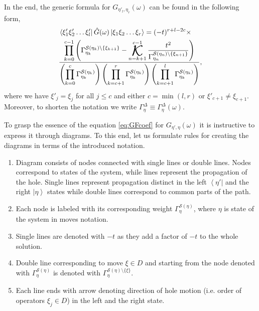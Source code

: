 \documentclass[11pt, a4paper, twocolumn]{article}
\newcommand{\ket}[1]{\left\vert #1 \right\rangle}
\newcommand{\bra}[1]{\left\langle #1 \right\vert}
\def\K{%
    \operatornamewithlimits{%
        \mathchoice{%
            \vcenter{\hbox{\huge $\mathcal{K}$}}%
        }{%
            \vcenter{\hbox{\Large $\mathcal{K}$}}%
        }{%
            \mathrm{\mathcal{K}}%
        }{%
            \mathrm{\mathcal{K}}%
        }
    }
}
\begin{document}
In the end, the generic formula for $G_{\eta'_l, \eta_r}(\omega)$ can be found in the following form, 
\begin{equation}\label{eq:GFcoef}
	\begin{split}
		&\bra{\xi'_1 \xi'_2 \hdots \xi'_l}
		\hat{G}(\omega)
		\ket{\xi_1 \xi_2 \hdots \xi_r} = (-t)^{r + l - 2c} \times \\
		&\frac{\displaystyle
		\prod_{k=0}^{c-1} \left(
			\Gamma_{\eta_k}^{\mathcal{S}(\eta_k)\setminus\{\xi_{k+1}\}} - \K_{n=k+1}^{c-1} \frac{t^2}{\Gamma_{\eta_n}^{\mathcal{S}(\eta_n)\setminus\{\xi_{n+1}\}}}
		\right)
		}{\displaystyle
		\left(
			\prod_{k=0}^{c} \Gamma_{\eta_k}^{\mathcal{S}(\eta_k)}
		\right)
		\left(
			\prod_{k=c+1}^{r} \Gamma_{\eta_k}^{\mathcal{S}(\eta_k)}
		\right)
		\left(
			\prod_{k=c+1}^{l} \Gamma_{\eta_k}^{\mathcal{S}(\eta_k)}
		\right)
		},    
	\end{split}
\end{equation}
where we have $\xi'_j = \xi_j$ for all $j \leq c$ and either $c = \min(l,r)$ or $\xi'_{c+1} \neq \xi_{c+1}$. Moreover, to shorten the notation we write $\Gamma_\eta^\Delta \equiv \Gamma_\eta^\Delta(\omega)$.

To grasp the essence of the equation \eqref{eq:GFcoef} for $G_{\eta', \eta}(\omega)$ it is instructive to express it through diagrams. To this end, let us formulate rules for creating the diagrams in terms of the introduced notation. 
\begin{enumerate}
    \item Diagram consists of nodes connected with single lines or double lines. Nodes correspond to states of the system, while lines represent the propagation of the hole. Single lines represent propagation distinct in the left $\bra{\eta'}$ and the right $\ket{\eta}$ states while double lines correspond to common parts of the path.
    \item Each node is labeled with its corresponding weight $\Gamma_{\eta}^{\mathcal{S}(\eta)}$, where $\eta$ is state of the system in moves notation.
    \item Single lines are denoted with $-t$ as they add a factor of $-t$ to the whole solution.
    \item Double line corresponding to move $\xi \in D$ and starting from the node denoted with $\Gamma_{\eta}^{\mathcal{S}(\eta)}$ is denoted with $\Gamma_{\eta}^{\mathcal{S}(\eta) \setminus \{\xi\}}$.
    \item Each line ends with arrow denoting direction of hole motion (i.e. order of operators $\xi_j \in D$) in the left and the right state.
\end{enumerate}
\end{document}
